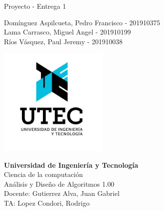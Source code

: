\begin{titlepage}
    \begin{center}
        \vspace*{1cm}
            
        \Huge
        Proyecto - Entrega 1
            
        \vspace{1cm}
        \Large
        Domínguez Aspilcueta, Pedro Francisco - 201910375\\
        Lama Carrasco, Miguel Angel - 201910199\\
        Ríos Vásquez, Paul Jeremy - 201910038\\
            
        \vfill
            
        \includegraphics[width=0.4\textwidth]{logo.jpg}
            
        \normalsize
        \textbf{Universidad de Ingeniería y Tecnología}\\
        Ciencia de la computación\\
        Análisis y Diseño de Algoritmos 1.00\\
        Docente: Gutierrez Alva, Juan Gabriel\\
        TA: Lopez Condori, Rodrigo\\
    \end{center}
\end{titlepage}